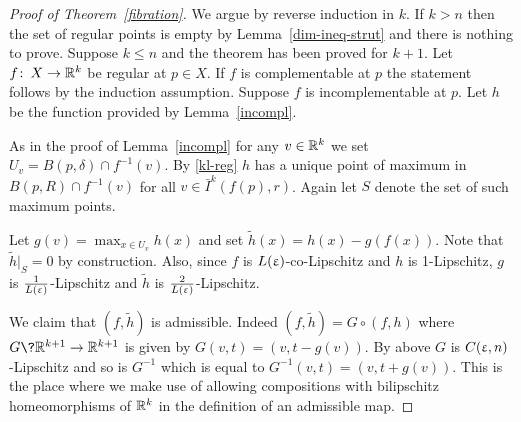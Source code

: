 \begin{proof}[Proof of Theorem~\ref{fibration}]


We argue by reverse induction in $k$.  If $k>n$ then the set of regular points is empty by Lemma~\ref{dim-ineq-strut} and there is nothing to prove. Suppose $k\le n$ and the theorem has been proved for $k+1$.
 Let $f\co X\to \R^k$ be regular at $p\in X$.
If $f$ is complementable at $p$ the statement follows by the induction assumption. Suppose $f$ is incomplementable at $p$. Let $h$ be the function provided by Lemma~\ref{incompl}. 
\begin{comment}Suppose for simplicity that $h$ is identically zero on $S$. 
Let $U= f^{-1}\left(\bar{I}^k(f(p),r) \right)\cap\{-A<h<0\}\cap B(p,R)$ and $W=f^{-1}\left(\bar{I}^k(f(p),r) \right)\cap\{-A<h\le 0\}\cap B(p,R)$

Then $U=W\backslash S$ and $(f,h)$ is regular on $U$. Therefore the  local fibration theorem holds for $(f,h)$ on $U$ by induction assumption.  

By Lemma~\ref{incompl}, $(f,h)$ is proper on $U$ and hence, 
$(f,h)\co U\to \bar{I}^k(f(p),r)\times (-A,0)$ is a  bundle map by~\cite[6.10]{Sieb}. This means that
$U$ is homeomorphic to $F\times  \bar{I}^k(f(p),r)\times (-A,0)$ respecting $(f,h)$ where $F$ is an MCS-space of $\dim=n-k-1$. By Lemma~\ref{incompl}, we can extend this homeomorphism to
a homeomorphism $W\to KF\times \bar{I}^k(f(p),r)$ which proves the induction step.

The general case when $h$ is not  constant on $S$ is handled  by constructing an auxiliary function $\tilde h$ obtained by shifting $h$ by constants on each of the fiber of $f$ to make it identically zero on $S$. 
\end{comment}


 As in the proof of Lemma~\ref{incompl}  for any $v\in\R^k$ we set $U_v=B(p,\delta)\cap f^{-1}(v)$.
 By  \eqref{kl-reg} $h$ has a unique point of maximum  in $B(p,R)\cap f^{-1}(v)$ for all $v\in \bar{I}^k(f(p),r) $.  Again let $S$ denote the set of such maximum points.
 
 
Let $g (v)=\max_{x\in U_v}h(x)$ and set $\tilde h(x)=h(x)-g(f(x))$. 
Note that $\tilde h|_S=0$ by construction. 
Also,  since $f$ is $L(\upvarepsilon)$-co-Lipschitz 
and $h$ is 1-Lipschitz, 
$g$ is $\frac{1}{L(\upvarepsilon)}$-Lipschitz 
and $\tilde h$ is $\frac{2}{L(\upvarepsilon)}$-Lipschitz.
 
 We claim that $(f,\tilde h)$ is admissible. Indeed $(f,\tilde h)=G\circ (f,h)$ where $G\?\R^{k+1}\to\R^{k+1}$ is  given by $G(v,t)=(v, t-g(v))$.
 By above $G$ is $C(\upvarepsilon,n)$-Lipschitz and so is $G^{-1}$ which is equal to  $G^{-1}(v,t)=(v, t+g(v))$.
 This is the place where we make use of allowing compositions with bilipschitz homeomorphisms of $\mathbb{R}^k$ in the definition of an admissible map.
 

\end{proof}
